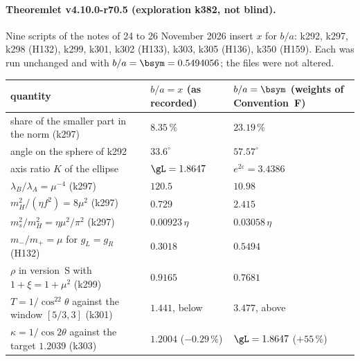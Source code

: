 \paragraph{Theoremlet v4.10.0-r70.5 (exploration k382, not blind).}
Nine scripts of the notes of 24 to 26 November 2026 insert \(x\) for \(b/a\): k292, k297, k298 (H132), k299, k301, k302 (H133), k303, k305
(H136), k350 (H159).  Each was run unchanged and with \(b/a=\bsym=0.5494056\); the files were not altered.
\begin{center}
\small
\begin{tabular}{@{}>{\raggedright\arraybackslash}p{}>{\raggedright\arraybackslash}p{}>{\raggedright\arraybackslash}p{}@{}}
\toprule
quantity & \(b/a=x\) (as recorded) & \(b/a=\bsym\) (weights of Convention~F)\\
\midrule
share of the smaller part in the norm (k297) & \(8.35\,\%\) & \(23.19\,\%\)\\
angle on the sphere of k292 & \(33.6^\circ\) & \(57.57^\circ\)\\
axis ratio \(K\) of the ellipse & \(\gL=1.8647\) & \(e^{2\varepsilon}=3.4386\)\\
\(\lambda_B/\lambda_A=\mu^{-4}\) (k297) & \(120.5\) & \(10.98\)\\
\(m_H^2/(\eta f^2)=8\mu^2\) (k297) & \(0.729\) & \(2.415\)\\
\(m_s^2/m_H^2=\eta\mu^2/\pi^2\) (k297) & \(0.00923\,\eta\) & \(0.03058\,\eta\)\\
\(m_-/m_+=\mu\) for \(g_L=g_R\) (H132) & \(0.3018\) & \(0.5494\)\\
\(\rho\) in version~S with \(1+\xi=1+\mu^2\) (k299) & \(0.9165\) & \(0.7681\)\\
\(T=1/\cos^22\theta\) against the window \([5/3,3]\) (k301) & \(1.441\), below & \(3.477\), above\\
\(\kappa=1/\cos2\theta\) against the target \(1.2039\) (k303) & \(1.2004\) (\(-0.29\,\%\)) & \(\gL=1.8647\) (\(+55\,\%\))\\
\bottomrule
\end{tabular}
\end{center}
